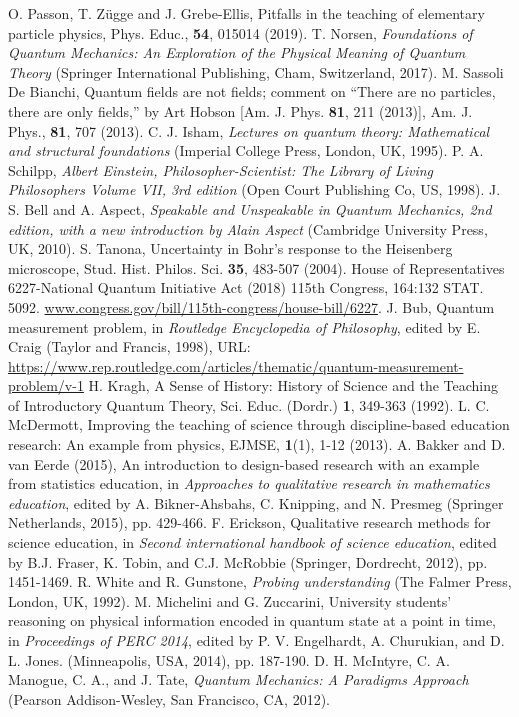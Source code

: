 \documentclass[twocolumn,secnumarabic,amssymb, nobibnotes, aps, prd, nofootinbib]{revtex4-2}
\begin{document}
\begin{thebibliography}{99}
 O. Passon, T. Z\"{u}gge and J. Grebe-Ellis, Pitfalls in the teaching of elementary particle physics, Phys. Educ., \textbf{54}, 015014 (2019).
 T. Norsen, \textit{Foundations of Quantum Mechanics: An Exploration of the Physical Meaning of Quantum Theory} (Springer International Publishing, Cham, Switzerland, 2017).
 M. Sassoli De Bianchi, Quantum fields are not fields; comment on ``There are no particles, there are only fields,'' by Art Hobson [Am. J. Phys. \textbf{81}, 211 (2013)], Am. J. Phys., \textbf{81}, 707 (2013).
 C. J. Isham, \textit{Lectures on quantum theory: Mathematical and structural foundations} (Imperial College Press, London, UK, 1995).
 P. A. Schilpp, \textit{Albert Einstein, Philosopher-Scientist: The Library of Living Philosophers Volume VII, 3rd edition} (Open Court Publishing Co, US, 1998).
 J. S. Bell and A. Aspect, \textit{Speakable and Unspeakable in Quantum Mechanics, 2nd edition, with a new introduction by Alain Aspect} (Cambridge University Press, UK, 2010).
 S. Tanona, Uncertainty in Bohr's response to the Heisenberg microscope, Stud. Hist. Philos. Sci. \textbf{35}, 483-507 (2004).
 House of Representatives 6227-National Quantum Initiative Act (2018) 115th Congress, 164:132 STAT. 5092. \url{www.congress.gov/bill/115th-congress/house-bill/6227}.
 J. Bub, Quantum measurement problem,  in \textit{Routledge Encyclopedia of Philosophy}, edited by E. Craig (Taylor and Francis, 1998), URL: \url{https://www.rep.routledge.com/articles/thematic/quantum-measurement-problem/v-1}
 H. Kragh, A Sense of History: History of Science and the Teaching of Introductory Quantum Theory, Sci. Educ. (Dordr.) \textbf{1}, 349-363 (1992).
 L. C. McDermott, Improving the teaching of science through discipline-based education research: An example from physics, EJMSE, \textbf{1}(1), 1-12 (2013).
 A. Bakker and D. van Eerde (2015), An introduction to design-based research with an example from statistics education, in \textit{Approaches to qualitative research in mathematics education}, edited by A. Bikner-Ahsbahs, C. Knipping, and N. Presmeg (Springer Netherlands, 2015), pp. 429-466.
 F. Erickson, Qualitative research methods for science education, in \textit{Second international
handbook of science education}, edited by  B.J. Fraser, K. Tobin, and C.J. McRobbie (Springer, Dordrecht, 2012), pp. 1451-1469.
 R. White and R. Gunstone, \textit{Probing understanding} (The Falmer Press, London, UK, 1992).
 M. Michelini and G. Zuccarini, University students’ reasoning on physical information encoded in quantum state at a point in time, in \textit{Proceedings of PERC 2014}, edited by P. V. Engelhardt, A. Churukian, and D. L. Jones. (Minneapolis, USA, 2014), pp. 187-190.
 D. H. McIntyre, C. A. Manogue, C. A., and J. Tate, \textit{Quantum Mechanics: A Paradigms Approach} (Pearson Addison-Wesley, San Francisco, CA, 2012).


\end{thebibliography}
\end{document}
